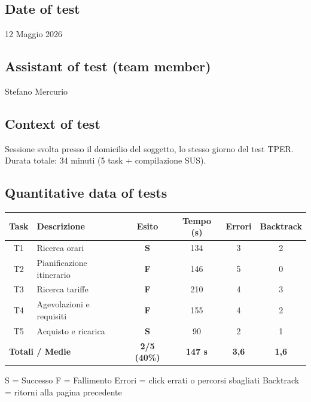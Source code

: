 ﻿\documentclass[11pt,a4paper]{article}
\begin{document}
\subsection*{Date of test}
\begin{tcolorbox}[base]
12 Maggio 2026
\end{tcolorbox}

\subsection*{Assistant of test (team member)}
\begin{tcolorbox}[base]
Stefano Mercurio
\end{tcolorbox}

\subsection*{Context of test}
\begin{tcolorbox}[base]
Sessione svolta presso il domicilio del soggetto, lo stesso giorno del test TPER. Durata totale: 34 minuti (5 task +
compilazione SUS).
\end{tcolorbox}

\subsection*{Quantitative data of tests}
\begin{tcolorbox}[base]
\begin{center}
\renewcommand{\arraystretch}{1.4}
\begin{tabular}{clcccc}
\toprule
\textbf{Task} & \textbf{Descrizione} &
\textbf{Esito} & \textbf{Tempo (s)} &
\textbf{Errori} & \textbf{Backtrack} \\
\midrule
T1 & Ricerca orari             & \textbf{S} & 134 & 3 & 2 \\
T2 & Pianificazione itinerario & \textbf{F} & 146 & 5 & 0 \\
T3 & Ricerca tariffe           & \textbf{F} & 210 & 4 & 3 \\
T4 & Agevolazioni e requisiti  & \textbf{F} & 155 & 4 & 2 \\
T5 & Acquisto e ricarica       & \textbf{S} & 90 & 2 & 1 \\
\midrule
\multicolumn{2}{l}{\textbf{Totali / Medie}} &
\textbf{2/5 (40\%)} & \textbf{147 s} &
\textbf{3,6} & \textbf{1,6} \\
\bottomrule
\end{tabular}
\end{center}
\vspace{0.3cm}
\small S = Successo \quad F = Fallimento \quad
Errori = click errati o percorsi sbagliati \quad
Backtrack = ritorni alla pagina precedente
\end{tcolorbox}
\end{document}
